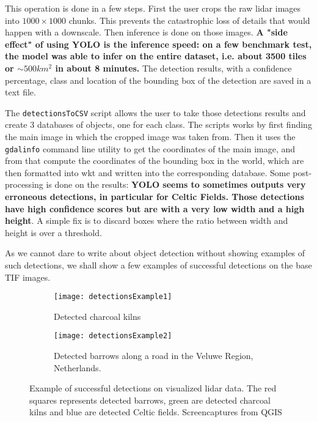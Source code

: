 This operation is done in a few steps. First the user crops the raw \gls{lidar} images into $1000 \times 1000$ chunks. This prevents the catastrophic loss of details that would happen with a downscale. Then inference is done on those images. \textbf{A "side effect" of using YOLO is the inference speed: on a few benchmark test, the model was able to infer on the entire dataset, i.e. about 3500 tiles or $\sim 500 km^2$ in about 8 minutes. } The detection results, with a confidence percentage, class and location of the bounding box of the detection are saved in a text file. 

The \verb|detectionsToCSV| script allows the user to take those detections results and create 3 databases of objects, one for each class. The scripts works by first finding the main image in which the cropped image was taken from. Then it uses the \verb|gdalinfo| command line utility to get the coordinates of the main image, and from that compute the coordinates of the bounding box in the world, which are then formatted into \gls{wkt} and written into the corresponding database. Some post-processing is done on the results: \textbf{YOLO seems to sometimes outputs very erroneous detections, in particular for Celtic Fields. Those detections have high confidence scores but are with a very low width and a high height}. A simple fix is to discard boxes where the ratio between width and height is over a threshold. 

As we cannot dare to write about object detection without showing examples of such detections, we shall show a few examples of successful detections on the base TIF images. 

\begin{figure}
	\centering
	\begin{subfigure}[b]{\textwidth}
		\centering
		\texttt{[image: detectionsExample1]}
		\caption[]{Detected charcoal kilns}    
		\label{fig:detectExample1}
	\end{subfigure}
	\begin{subfigure}[b]{\textwidth}  
		\centering 
		\texttt{[image: detectionsExample2]}
		\caption[]{Detected barrows along a road in the Veluwe Region, Netherlands.}    
		\label{fig:detectExample2}
	\end{subfigure}
	\caption{Example of successful detections on visualized \gls{lidar} data. The red squares represents detected barrows, green are detected charcoal kilns and blue are detected Celtic fields. Screencaptures from QGIS}
\end{figure}


